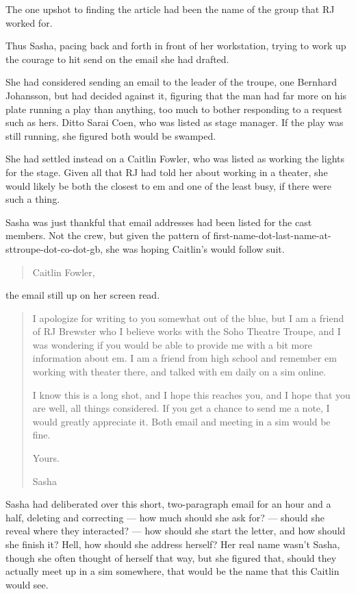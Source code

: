 The one upshot to finding the article had been the name of the group that RJ worked for.

Thus Sasha, pacing back and forth in front of her workstation, trying to work up the courage to hit send on the email she had drafted.

She had considered sending an email to the leader of the troupe, one Bernhard Johansson, but had decided against it, figuring that the man had far more on his plate running a play than anything, too much to bother responding to a request such as hers. Ditto Sarai Coen, who was listed as stage manager. If the play was still running, she figured both would be swamped.

She had settled instead on a Caitlin Fowler, who was listed as working the lights for the stage. Given all that RJ had told her about working in a theater, she would likely be both the closest to em and one of the least busy, if there were such a thing.

Sasha was just thankful that email addresses had been listed for the cast members. Not the crew, but given the pattern of first-name-dot-last-name-at-sttroupe-dot-co-dot-gb, she was hoping Caitlin's would follow suit.

\begin{quote}
Caitlin Fowler,
\end{quote}

the email still up on her screen read.

\begin{quote}
I apologize for writing to you somewhat out of the blue, but I am a friend of RJ Brewster who I believe works with the Soho Theatre Troupe, and I was wondering if you would be able to provide me with a bit more information about em. I am a friend from high school and remember em working with theater there, and talked with em daily on a sim online.

I know this is a long shot, and I hope this reaches you, and I hope that you are well, all things considered. If you get a chance to send me a note, I would greatly appreciate it. Both email and meeting in a sim would be fine.

Yours.

Sasha
\end{quote}

Sasha had deliberated over this short, two-paragraph email for an hour and a half, deleting and correcting --- how much should she ask for? --- should she reveal where they interacted? --- how should she start the letter, and how should she finish it? Hell, how should she address herself? Her real name wasn't Sasha, though she often thought of herself that way, but she figured that, should they actually meet up in a sim somewhere, that would be the name that this Caitlin would see.


